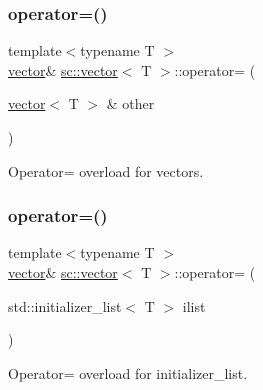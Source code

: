 \mbox{\label{classsc_1_1vector_ace673225b78ef6d02561b9e2777398c2}} 
\subsubsection{\texorpdfstring{operator=()}{operator=()}\hspace{0.1cm}{\footnotesize\ttfamily [1/2]}}
{\footnotesize\ttfamily template$<$typename T $>$ \\
\hyperlink{classsc_1_1vector}{vector}\& \hyperlink{classsc_1_1vector}{sc\+::vector}$<$ T $>$\+::operator= (\begin{DoxyParamCaption}\item[{\hyperlink{classsc_1_1vector}{vector}$<$ T $>$ \&}]{other }\end{DoxyParamCaption})\hspace{0.3cm}{\ttfamily [inline]}}



Operator= overload for vectors. 

\mbox{\label{classsc_1_1vector_a757984cf36675541db735350d227d609}} 
\subsubsection{\texorpdfstring{operator=()}{operator=()}\hspace{0.1cm}{\footnotesize\ttfamily [2/2]}}
{\footnotesize\ttfamily template$<$typename T $>$ \\
\hyperlink{classsc_1_1vector}{vector}\& \hyperlink{classsc_1_1vector}{sc\+::vector}$<$ T $>$\+::operator= (\begin{DoxyParamCaption}\item[{std\+::initializer\+\_\+list$<$ T $>$}]{ilist }\end{DoxyParamCaption})\hspace{0.3cm}{\ttfamily [inline]}}



Operator= overload for initializer\+\_\+list. 

\mbox{\label{classsc_1_1vector_ab93846461528695f38e1d143231b0653}} 
